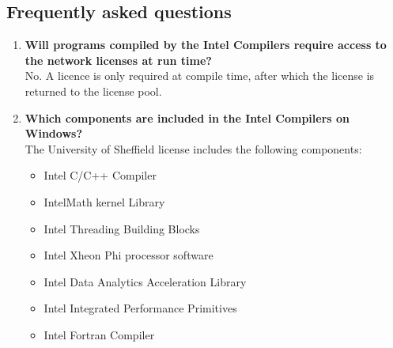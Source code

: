 \documentclass[10pt,a4paper,oneside]{article}
\begin{document}
\subsection*{Frequently asked questions}
\begin{enumerate}
\item \textbf{Will programs compiled by the Intel Compilers require access to the network licenses at run time?}\\
No. A licence is only required at compile time, after which the license is returned to the license pool.
\item \textbf{Which components are included in the Intel Compilers on Windows?}\\
The University of Sheffield license includes the following components:
\begin{itemize}
\item Intel C/C++ Compiler
\item IntelMath kernel Library
\item Intel Threading Building Blocks
\item Intel Xheon Phi processor software
\item Intel Data Analytics Acceleration Library 
\item Intel Integrated Performance Primitives
\item Intel Fortran Compiler
\end{itemize}
\end{enumerate}
\end{document}
